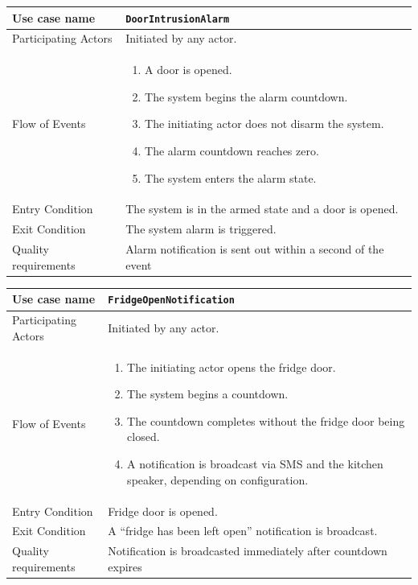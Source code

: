 \documentclass{report}
\begin{document}
\begin{tabular}{| l | p{12cm} |}
\hline
Use case name & \texttt{DoorIntrusionAlarm} \\ \hline
Participating Actors & Initiated by any actor. \\ \hline
Flow of Events & 

\begin{enumerate}
 \item A door is opened.
 \item The system begins the alarm countdown.
 \item The initiating actor does not disarm the system.
 \item The alarm countdown reaches zero.
 \item The system enters the alarm state.
\end{enumerate}

\\ \hline

Entry Condition & The system is in the armed state and a door is opened. \\ \hline
Exit Condition & The system alarm is triggered. \\ \hline
Quality requirements & Alarm notification is sent out within a second of the
event\\ \hline

\hline
\end{tabular}

\begin{tabular}{| l | p{12cm} |}
\hline
Use case name & \texttt{FridgeOpenNotification} \\ \hline
Participating Actors & Initiated by any actor. \\ \hline
Flow of Events & 

\begin{enumerate}
 \item The initiating actor opens the fridge door.
 \item The system begins a countdown.
 \item The countdown completes without the fridge door being closed.
 \item A notification is broadcast via SMS and the kitchen speaker, depending on configuration.
\end{enumerate}

\\ \hline

Entry Condition & Fridge door is opened. \\ \hline
Exit Condition & A ``fridge has been left open'' notification is broadcast. \\ \hline
Quality requirements & Notification is broadcasted immediately after countdown
expires \\ \hline

\hline
\end{tabular}
\end{document}
